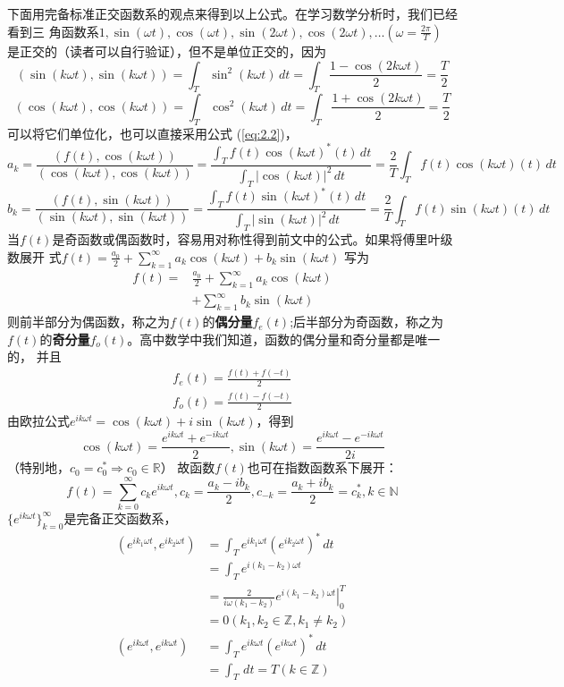 \documentclass{ctexbook}
\newcommand{\evalat}[3]{\left.#1\right|_{#2}^{#3}}
\begin{document}
下面用完备标准正交函数系的观点来得到以上公式。在学习数学分析时，我们已经看到三
角函数系$1,\sin(\omega t),\cos(\omega t),\sin(2\omega t),\cos(2\omega t),\dots(\omega =\frac{2\pi}{T})$
是正交的（读者可以自行验证），但不是单位正交的，因为
\[(\sin(k\omega t),\sin(k\omega t))=\int_{T}\sin^2(k\omega t)\,dt=\int_{T}\frac{1-\cos(2k\omega t)}{2}=\frac{T}{2}\]
\[(\cos(k\omega t),\cos(k\omega t))=\int_{T}\cos^2(k\omega t)\,dt=\int_{T}\frac{1+\cos(2k\omega t)}{2}=\frac{T}{2}\]
可以将它们单位化，也可以直接采用公式 (\ref{eq:2.2})，
\[a_k=\frac{(f(t),\cos(k\omega t))}{(\cos(k\omega t),\cos(k\omega t))}=\frac{\int_{T}f(t)\cos(k\omega t)^*(t)\,dt}{\int_{T}|\cos(k\omega t)|^2\,dt}
    =\frac{2}{T}\int_{T}f(t)\cos(k\omega t)(t)\,dt\]
\[b_k=\frac{(f(t),\sin(k\omega t))}{(\sin(k\omega t),\sin(k\omega t))}=\frac{\int_{T}f(t)\sin(k\omega t)^*(t)\,dt}{\int_{T}|\sin(k\omega t)|^2\,dt}
    =\frac{2}{T}\int_{T}f(t)\sin(k\omega t)(t)\,dt\]
当$f(t)$是奇函数或偶函数时，容易用对称性得到前文中的公式。如果将傅里叶级数展开
式$f(t) =\frac{a_0}{2}+\sum_{k = 1}^{\infty} a_k \cos(k\omega t)+b_k\sin(k\omega t)$
写为
\begin{align*}
    f(t) = & \frac{a_0}{2}+\sum_{k = 1}^{\infty} a_k \cos(k\omega t) \\
           & +\sum_{k = 1}^{\infty} b_k \sin(k\omega t)
\end{align*}
则前半部分为偶函数，称之为$f(t)$的\textbf{偶分量}$f_e(t)$;后半部分为奇函数，称之为
$f(t)$的\textbf{奇分量}$f_o(t)$。高中数学中我们知道，函数的偶分量和奇分量都是唯一的，
并且\begin{align*}
    f_e(t)=\frac{f(t)+f(-t)}{2} \\
    f_o(t)=\frac{f(t)-f(-t)}{2}
\end{align*}
由欧拉公式$e^{ik\omega t}=\cos(k\omega t)+i\sin(k\omega t)$，得到
\[\cos(k\omega t)=\frac{e^{ik\omega t}+e^{-ik\omega t}}{2},\sin(k\omega t)=\frac{e^{ik\omega t}-e^{-ik\omega t}}{2i}\]
（特别地，$c_0=c_0^*\Rightarrow c_0\in\mathbb{R} $）
故函数$f(t)$也可在指数函数系下展开：
\[f(t)=\sum_{k = 0}^{\infty}  c_k e^{ik\omega t} ,c_k=\frac{a_k-ib_k}{2},c_{-k}=\frac{a_k+ib_k}{2}=c_k^*,k\in \mathbb{N}\]
$\{e^{ik\omega t}\}_{k=0}^{\infty}$是完备正交函数系，
\begin{align*}
    (e^{ik_1\omega t},e^{ik_2\omega t}) & =\int_{T}e^{ik_1\omega t}(e^{ik_2\omega t})^*\,dt                 \\
                                        & =\int_{T}e^{i(k_1-k_2)\omega t}                                   \\
                                        & =\frac{2}{i\omega (k_1-k_2)}\evalat{e^{i(k_1-k_2)\omega t}}{0}{T} \\
                                        & =0(k_1,k_2\in \mathbb{Z},k_1\neq k_2)                             \\
    (e^{ik\omega t},e^{ik\omega t})     & =\int_{T}e^{ik\omega t}(e^{ik\omega t})^*\,dt                     \\
                                        & =\int_{T}\,dt=T(k\in \mathbb{Z} )
\end{align*}
\end{document}
